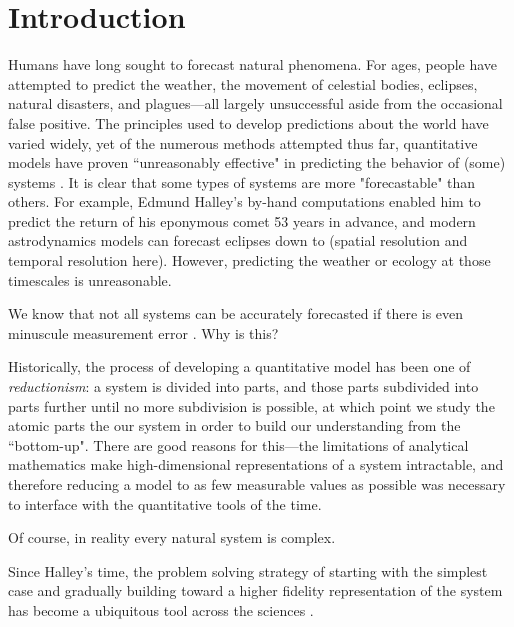 \documentclass[]{article}
\begin{document}
    
\clearpage

{
\hypersetup{linkcolor=black}
\setcounter{tocdepth}{3}
\normalfont
\tableofcontents
}
\clearpage
\section{Introduction}

Humans have long sought to forecast natural phenomena. For ages, people have attempted to predict the weather, the movement of celestial bodies,  eclipses, natural disasters, and plagues---all largely unsuccessful aside from the occasional false positive. The principles used to develop predictions about the world have varied widely, yet of the numerous methods attempted thus far, quantitative models have proven ``unreasonably effective" in predicting the behavior of (some) systems \cite{unreas}. 
It is clear that some types of systems are more "forecastable" than others. For example, Edmund Halley's by-hand computations enabled him to predict the return of his eponymous comet 53 years in advance, and modern astrodynamics models can forecast eclipses down to (spatial resolution and temporal resolution here). However, predicting the weather or ecology at those timescales is unreasonable.     


We know that not all systems can be accurately forecasted if there is even minuscule measurement error \cite{chaos}.
Why is this? 


Historically, the process of developing a quantitative model has been one of \textit{reductionism}: a system is divided into parts, and those parts subdivided into parts further until no more subdivision is possible, at which point we study the atomic parts the our system in order to build our understanding from the ``bottom-up". There are good reasons for this---the limitations of analytical mathematics make high-dimensional representations of a system intractable, and therefore reducing a model to as few measurable values as possible was necessary to interface with the quantitative tools of the time. 

Of course, in reality every natural system is complex. 








Since Halley's time, the problem solving strategy of starting with the simplest case and gradually building toward a higher fidelity representation of the system has become a ubiquitous tool across the sciences \cite{polya_how_2009}.
\end{document}
